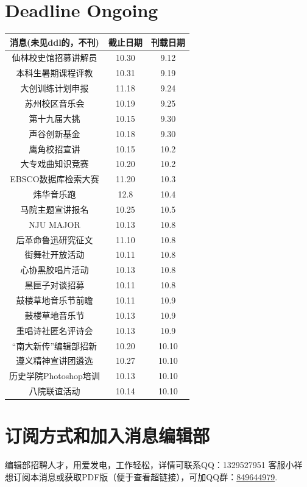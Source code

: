 \documentclass[letterpaper, 12pt]{article}
\begin{document}
\begin{multicols}{2}

\section{Deadline Ongoing}
\begin{tabular}{|c|c|c|}
    \hline
    消息(未见ddl的，不刊) & 截止日期 & 刊载日期\\
    \hline\hline
    仙林校史馆招募讲解员 & 10.30 & 9.12\\
    本科生暑期课程评教 & 10.31 & 9.19\\
    大创训练计划申报 & 11.18 & 9.24\\
    苏州校区音乐会 & 10.19 & 9.25\\
    第十九届大挑 & 10.15 & 9.30\\
    声谷创新基金 & 10.18 & 9.30\\
    鹰角校招宣讲 & 10.15 & 10.2\\
    大专戏曲知识竞赛 & 10.20 & 10.2\\
    EBSCO数据库检索大赛 & 11.20 & 10.3\\
    炜华音乐跑 & 12.8 & 10.4\\
    马院主题宣讲报名 & 10.25 & 10.5\\
    NJU MAJOR & 10.13 & 10.8\\
    后革命鲁迅研究征文 & 11.10 & 10.8\\
    街舞社开放活动 & 10.11 & 10.8\\
    心协黑胶唱片活动 & 10.13 & 10.8\\
    黑匣子对谈招募 & 10.11 & 10.8\\
    鼓楼草地音乐节前瞻 & 10.11 & 10.9\\
    鼓楼草地音乐节 & 10.13 & 10.9\\
    重唱诗社匿名评诗会 & 10.13 & 10.9\\
    “南大新传”编辑部招新 & 10.20 & 10.10\\
    遵义精神宣讲团遴选 & 10.27 & 10.10\\
    历史学院Photoshop培训 & 10.13 & 10.10\\
    八院联谊活动 & 10.14 & 10.10\\
    
    \hline
\end{tabular}
\section{订阅方式和加入消息编辑部}
编辑部招聘人才，用爱发电，工作轻松，详情可联系QQ：1329527951 客服小祥\\想订阅本消息或获取PDF版（便于查看超链接），可加QQ群：\href{https://qm.qq.com/q/FGX1VYCrGS}{849644979}.

\end{multicols}
\end{document}
